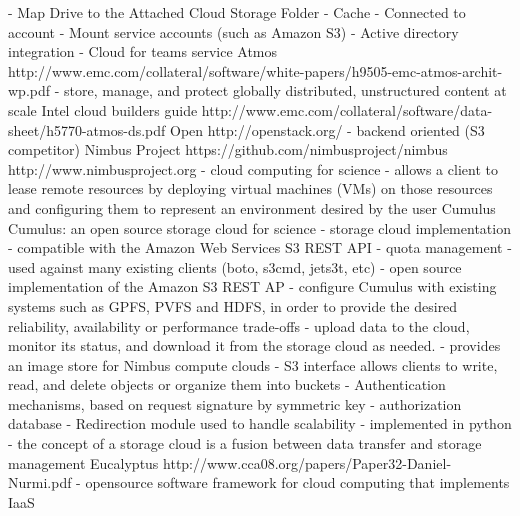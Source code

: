 					- Map Drive to the Attached Cloud Storage Folder
					- Cache 
					- Connected to account
					- Mount service accounts (such as Amazon S3)
					- Active directory integration
				- Cloud for teams service
			Atmos 
				http://www.emc.com/collateral/software/white-papers/h9505-emc-atmos-archit-wp.pdf
				- store, manage, and protect globally distributed, unstructured content at scale
				Intel cloud builders guide
				http://www.emc.com/collateral/software/data-sheet/h5770-atmos-ds.pdf
		Open
			http://openstack.org/
				- backend oriented (S3 competitor)
			Nimbus Project
				https://github.com/nimbusproject/nimbus
				http://www.nimbusproject.org	
					- cloud computing for science
					- allows a client to lease remote resources by deploying virtual machines (VMs) on those resources and configuring them to represent an environment desired by the user					
				Cumulus
					Cumulus: an open source storage cloud for science
						- storage cloud implementation
						- compatible with the Amazon Web Services S3 REST API
						- quota management
						- used against many existing clients (boto, s3cmd, jets3t, etc)
						- open source implementation of the Amazon S3 REST AP
						- configure Cumulus with existing systems such as GPFS, PVFS and HDFS, in order to provide the desired reliability, availability or performance trade-offs
						- upload data to the cloud, monitor its status, and download it from the storage cloud as needed.
						- provides an image store for Nimbus compute clouds
						- S3 interface allows clients to write, read, and delete objects or organize them into buckets
						- Authentication mechanisms, based on request signature by symmetric key
						- authorization database
						- Redirection module used to handle scalability
						- implemented in python
						- the concept of a storage cloud is a fusion between data transfer and storage management
			Eucalyptus
				http://www.cca08.org/papers/Paper32-Daniel-Nurmi.pdf		
					- opensource software framework for cloud computing that implements IaaS
			
